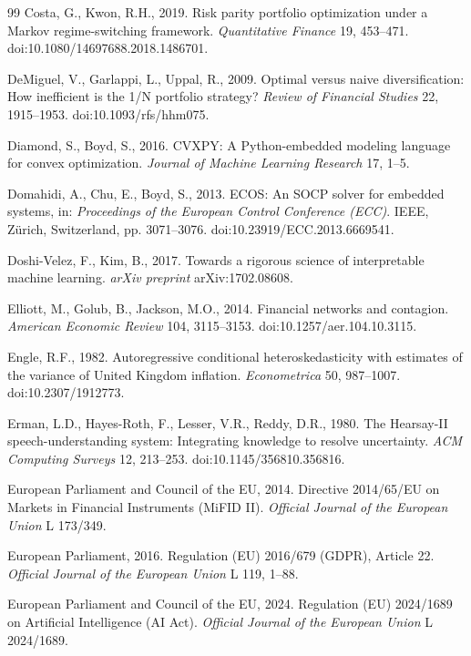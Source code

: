 \documentclass[11pt]{article}
\begin{document}
\begin{thebibliography}{99}
Costa, G., Kwon, R.H., 2019. Risk parity portfolio optimization under a Markov regime-switching framework. \textit{Quantitative Finance} 19, 453--471. doi:10.1080/14697688.2018.1486701.

DeMiguel, V., Garlappi, L., Uppal, R., 2009. Optimal versus naive diversification: How inefficient is the 1/N portfolio strategy? \textit{Review of Financial Studies} 22, 1915--1953. doi:10.1093/rfs/hhm075.

Diamond, S., Boyd, S., 2016. CVXPY: A Python-embedded modeling language for convex optimization. \textit{Journal of Machine Learning Research} 17, 1--5.

Domahidi, A., Chu, E., Boyd, S., 2013. ECOS: An SOCP solver for embedded systems, in: \textit{Proceedings of the European Control Conference (ECC)}. IEEE, Z\"urich, Switzerland, pp. 3071--3076. doi:10.23919/ECC.2013.6669541.

Doshi-Velez, F., Kim, B., 2017. Towards a rigorous science of interpretable machine learning. \textit{arXiv preprint} arXiv:1702.08608.

Elliott, M., Golub, B., Jackson, M.O., 2014. Financial networks and contagion. \textit{American Economic Review} 104, 3115--3153. doi:10.1257/aer.104.10.3115.

Engle, R.F., 1982. Autoregressive conditional heteroskedasticity with estimates of the variance of United Kingdom inflation. \textit{Econometrica} 50, 987--1007. doi:10.2307/1912773.

Erman, L.D., Hayes-Roth, F., Lesser, V.R., Reddy, D.R., 1980. The Hearsay-II speech-understanding system: Integrating knowledge to resolve uncertainty. \textit{ACM Computing Surveys} 12, 213--253. doi:10.1145/356810.356816.

European Parliament and Council of the EU, 2014. Directive 2014/65/EU on Markets in Financial Instruments (MiFID II). \textit{Official Journal of the European Union} L 173/349.

European Parliament, 2016. Regulation (EU) 2016/679 (GDPR), Article 22. \textit{Official Journal of the European Union} L 119, 1--88.

European Parliament and Council of the EU, 2024. Regulation (EU) 2024/1689 on Artificial Intelligence (AI Act). \textit{Official Journal of the European Union} L 2024/1689.


\end{thebibliography}
\end{document}
